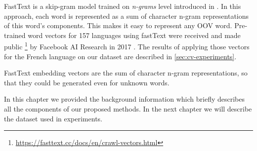 FastText is a skip-gram model trained on \textit{n-grams} level
introduced in \cite{Bojanowski-ACL2017}. In this approach, each word
is represented as a sum of character n-gram representations of this word's
components. This makes it easy to represent any OOV word. Pre-trained word vectors for 157 languages using fastText were received and made public \footnote{\url{https://fasttext.cc/docs/en/crawl-vectors.html}} by Facebook AI Research in 2017 \citep{Mikolov-2017}. The results of applying those vectors for the French language on our dataset are described in \ref{sec:cv-experiments}.

FastText embedding vectors are the sum of character n-gram representations, so that they could be generated even for unknown words. 


\bigskip
In this chapter we provided the background information which briefly describes all the components of our proposed methods. In the next chapter we will describe the dataset used in experiments.